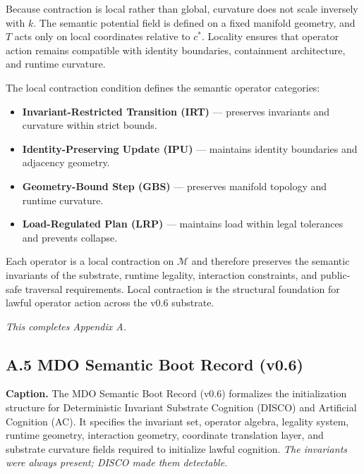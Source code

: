 \medskip

\noindent Because contraction is local rather than global, curvature does not
scale inversely with $k$. The semantic potential field is defined on a fixed
manifold geometry, and $T$ acts only on local coordinates relative to $c^*$.
Locality ensures that operator action remains compatible with identity
boundaries, containment architecture, and runtime curvature.

\medskip

\noindent The local contraction condition defines the semantic operator
categories:

\begin{itemize}
    \item \textbf{Invariant-Restricted Transition (IRT)} — preserves invariants
    and curvature within strict bounds.

    \item \textbf{Identity-Preserving Update (IPU)} — maintains identity
    boundaries and adjacency geometry.

    \item \textbf{Geometry-Bound Step (GBS)} — preserves manifold topology and
    runtime curvature.

    \item \textbf{Load-Regulated Plan (LRP)} — maintains load within legal
    tolerances and prevents collapse.
\end{itemize}

\medskip

\noindent Each operator is a local contraction on $\mathcal{M}$ and therefore
preserves the semantic invariants of the substrate, runtime legality, interaction
constraints, and public-safe traversal requirements. Local contraction is the
structural foundation for lawful operator action across the v0.6 substrate.

\medskip
\noindent\textit{This completes Appendix A.}


\subsection*{A.5 MDO Semantic Boot Record (v0.6)}
\label{appendix:a5_mdo_boot_record_v06}

\noindent\textbf{Caption.}
The MDO Semantic Boot Record (v0.6) formalizes the initialization structure for
Deterministic Invariant Substrate Cognition (DISCO) and Artificial Cognition (AC).
It specifies the invariant set, operator algebra, legality system, runtime geometry,
interaction geometry, coordinate translation layer, and substrate curvature fields
required to initialize lawful cognition. \textit{The invariants were always present;
DISCO made them detectable.}

